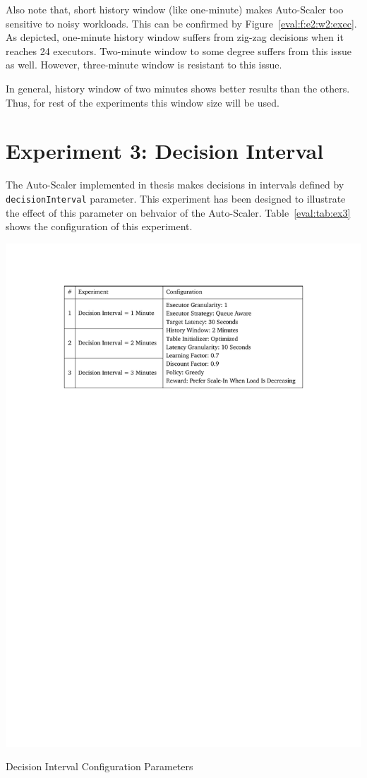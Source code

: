 Also note that, short history window (like one-minute) makes Auto-Scaler too sensitive to noisy workloads. This can be confirmed by Figure~\ref{eval:f:e2:w2:exec}. As depicted, one-minute history window suffers from zig-zag decisions when it reaches 24 executors. Two-minute window to some degree suffers from this issue as well. However, three-minute window is resistant to this issue.

In general, history window of two minutes shows better results than the others. Thus, for rest of the experiments this window size will be used.
\clearpage
\section{Experiment 3: Decision Interval}
The Auto-Scaler implemented in thesis makes decisions in intervals defined by \lstinline|decisionInterval| parameter. This experiment has been designed to illustrate the effect of this parameter on behvaior of the Auto-Scaler. Table~\ref{eval:tab:ex3} shows the configuration of this experiment.
\begin{table}[h]
    \includegraphics[clip,trim=3.3cm 21.18cm 3.25cm 2.5cm]{tables/ex3.pdf}
    \centering
    \caption{Decision Interval Configuration Parameters}
    \label{eval:tab:ex3}
\end{table}


